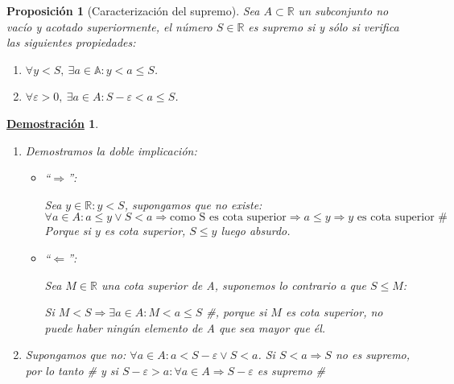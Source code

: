 \documentclass[10pt,a4paper,openright]{book}
\theoremstyle{break}
\newtheorem{prop}{Proposición}[chapter]
\newtheorem*{demo}{\underline{Demostración}}
\begin{document}
\begin{prop}[Caracterización del supremo]
Sea $A\subset \mathbb R$ un subconjunto no vacío y acotado superiormente, el número $S\in \mathbb R$ es supremo si y sólo si verifica las siguientes propiedades:
\begin{enumerate}
\item $\forall y < S, \ \exists a\in \mathbb A: y<a\leq S$.
\item $\forall \varepsilon>0, \ \exists a\in A: S- \varepsilon <a\leq S$.
\end{enumerate}
\end{prop}
\begin{demo}
\begin{enumerate}
\item Demostramos la doble implicación:
	\begin{itemize}
	\item ``$\Rightarrow$'':\par
	Sea $y\in \mathbb R: y<S$, supongamos que no existe:
	$$\forall a \in A: a\leq y \vee S<a\Rightarrow \mbox{como S es cota superior}\Rightarrow a\leq y\Rightarrow y \mbox{ es cota superior \#}$$
	Porque si $y$ es cota superior, $S\leq y$ luego absurdo.
	
	\item ``$\Leftarrow$'':\par
	Sea $M\in \mathbb R$ una cota superior de A, suponemos lo contrario a que $S\leq M$:\par
	Si $M<S\Rightarrow \exists a\in A: M<a\leq S$ \#, porque si $M$ es cota superior, no puede haber ningún elemento de A que sea mayor que él.
	\end{itemize}
	
\item Supongamos que no: $\forall a \in A: a<S-\varepsilon \vee S< a$. Si $S<a\Rightarrow S$ no es supremo, por lo tanto \# y si $S-\varepsilon> a: \forall a \in A\Rightarrow S-\varepsilon$ es supremo \#
\end{enumerate}
\end{demo}
\end{document}
